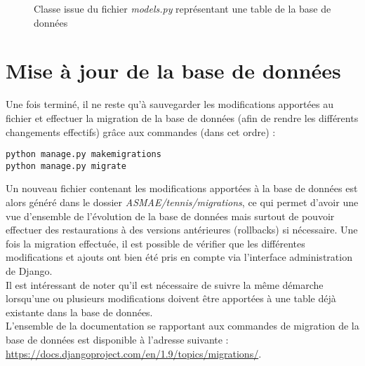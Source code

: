 \begin{figure}[!ht]
\centering
\begin{framed}

\end{framed}
\caption{Classe issue du fichier \textit{models.py} représentant une table de la base de données}
\label{fig:Classe issue du fichier models.py représentant une table de la base de données}
\end{figure}
\FloatBarrier

\section{Mise à jour de la base de données}

Une fois terminé, il ne reste qu'à sauvegarder les modifications apportées au fichier et effectuer la migration de la base de données (afin de rendre les différents changements effectifs) grâce aux commandes (dans cet ordre) : 

\begin{verbatim}
python manage.py makemigrations
python manage.py migrate
\end{verbatim}

Un nouveau fichier contenant les modifications apportées à la base de données est alors généré dans le dossier \textit{ASMAE/tennis/migrations}, ce qui permet d'avoir une vue d'ensemble de l'évolution de la base de données mais surtout de pouvoir effectuer des restaurations à des versions antérieures (rollbacks) si nécessaire. Une fois la migration effectuée, il est possible de vérifier que les différentes modifications et ajouts ont bien été pris en compte via l'interface administration de Django.\\

Il est intéressant de noter qu'il est nécessaire de suivre la même démarche lorsqu'une ou plusieurs modifications doivent être apportées à une table déjà existante dans la base de données.\\

L'ensemble de la documentation se rapportant aux commandes de migration de la base de données est disponible à l'adresse suivante : \url{https://docs.djangoproject.com/en/1.9/topics/migrations/}.\\

